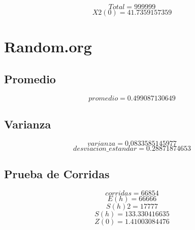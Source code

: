 \documentclass{article}
\begin{document}
$$
Total = 999999
$$
$$
X2(0) = 41.7359157359
$$
\section{Random.org}


\subsection{Promedio}
$$
promedio = 0.499087130649
$$


\subsection{Varianza}
$$
varianza = 0.0833585145977
$$
$$
desviacion\_estandar = 0.28871874653
$$


\subsection{Prueba de Corridas}
$$
corridas = 66854
$$
$$
E(h) = 66666
$$
$$
S(h)2 = 17777
$$
$$
S(h) = 133.330416635
$$
$$
Z(0) = 1.41003084476
$$
\end{document}
